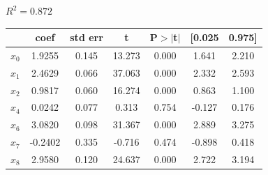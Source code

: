 \documentclass{article}
\begin{document}
\begin{center}
$R^2 = 0.872$\\
\begin{tabular}{lcccccc}
\hline
           & \textbf{coef} & \textbf{std err} & \textbf{t} & \textbf{P$> |$t$|$} & \textbf{[0.025} & \textbf{0.975]}  \\
\midrule
\textbf{$x_0$} &       1.9255  &        0.145     &    13.273  &         0.000        &        1.641    &        2.210     \\
\textbf{$x_1$} &       2.4629  &        0.066     &    37.063  &         0.000        &        2.332    &        2.593     \\
\textbf{$x_2$} &       0.9817  &        0.060     &    16.274  &         0.000        &        0.863    &        1.100     \\
\textbf{$x_4$} &       0.0242  &        0.077     &     0.313  &         0.754        &       -0.127    &        0.176     \\
\textbf{$x_6$} &       3.0820  &        0.098     &    31.367  &         0.000        &        2.889    &        3.275     \\
\textbf{$x_7$} &      -0.2402  &        0.335     &    -0.716  &         0.474        &       -0.898    &        0.418     \\
\textbf{$x_8$} &       2.9580  &        0.120     &    24.637  &         0.000        &        2.722    &        3.194     \\
\bottomrule
\end{tabular}
\end{center}
\end{document}

